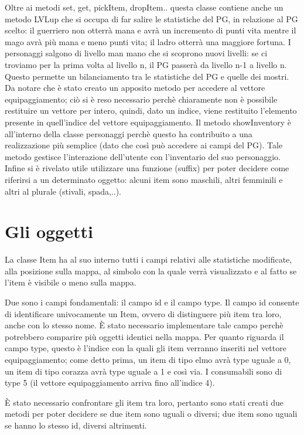 \documentclass[10pt]{report}
\begin{document}
Oltre ai metodi set, get, pickItem, dropItem.. questa classe contiene anche un metodo LVLup che si occupa
di far salire le statistiche del PG, in relazione al PG scelto: il guerriero non otterrà mana e avrà un
incremento di punti vita mentre il mago avrà più mana e meno punti vita; il ladro otterrà una maggiore
fortuna. I personaggi salgono di livello man mano che si scoprono nuovi livelli: se ci troviamo per la prima volta al
livello n, il PG passerà da livello n-1 a livello n. Questo permette un bilanciamento tra
le statistiche del PG e quelle dei mostri.
Da notare che è stato creato un apposito metodo per accedere al vettore equipaggiamento; ciò si è reso
necessario perchè chiaramente non è possibile restituire un vettore per intero, quindi, dato un indice,
viene restituito l'elemento presente in quell'indice del vettore equipaggiamento.
Il metodo showInventory è all'interno della classe personaggi perchè questo ha contribuito a una 
realizzazione più semplice (dato che così può accedere ai campi del PG). Tale metodo gestisce
l'interazione dell'utente con l'inventario del suo personaggio.
Infine si è rivelato utile utilizzare una funzione (suffix) per poter decidere come riferirsi a un
determinato oggetto: alcuni item sono maschili, altri femminili e altri al plurale (stivali, spada,..).

\section{Gli oggetti}

La classe Item ha al suo interno tutti i campi relativi alle statistiche modificate, alla posizione sulla
mappa, al simbolo con la quale verrà visualizzato e al fatto se l'item è visibile o meno sulla mappa.

Due sono i campi fondamentali: il campo id e il campo type.
Il campo id consente di identificare univocamente un Item, ovvero di distinguere più item tra loro,
anche con lo stesso nome. È stato necessario implementare tale campo perchè potrebbero comparire più 
oggetti identici nella mappa. Per quanto riguarda il campo type, questo è l'indice con la quali gli item
verranno inseriti nel vettore equipaggiamento; come detto prima, un item di tipo elmo avrà type uguale a
0, un item di tipo corazza avrà type uguale a 1 e così via. I consumabili sono di type 5 (il vettore 
equipaggiamento arriva fino all'indice 4). 

È stato necessario confrontare gli item tra loro, pertanto sono stati creati due metodi per poter
decidere se due item sono uguali o diversi; due item sono uguali se hanno lo stesso id, diversi altrimenti.
\end{document}
